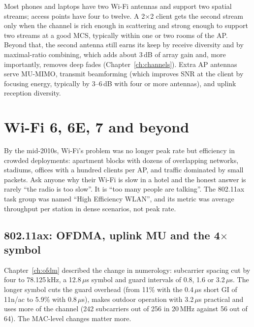\begin{inpractice}
Most phones and laptops have two Wi-Fi antennas and support two spatial streams; access points have
four to twelve. A 2$\times$2 client gets the second stream only when the channel is rich enough in
scattering and strong enough to support two streams at a good MCS, typically within one or two
rooms of the AP. Beyond that, the second antenna still earns its keep by receive diversity and by
maximal-ratio combining, which adds about 3\,dB of array gain and, more importantly, removes deep
fades (Chapter~\ref{ch:channels}). Extra AP antennas serve MU-MIMO, transmit beamforming (which
improves SNR at the client by focusing energy, typically by 3--6\,dB with four or more antennas), and
uplink reception diversity.
\end{inpractice}

\section{Wi-Fi 6, 6E, 7 and beyond}
\label{sec:ch22:he}

By the mid-2010s, Wi-Fi's problem was no longer peak rate but efficiency in crowded deployments:
apartment blocks with dozens of overlapping networks, stadiums, offices with a hundred clients per
AP, and traffic dominated by small packets. Ask anyone why their Wi-Fi is slow in a hotel and the
honest answer is rarely ``the radio is too slow''. It is ``too many people are talking''. The
802.11ax task group was named ``High Efficiency WLAN'', and its metric was average throughput per
station in dense scenarios, not peak rate.

\subsection{802.11ax: OFDMA, uplink MU and the 4$\times$ symbol}

Chapter~\ref{ch:ofdm} described the change in numerology: subcarrier spacing cut by four to
78.125\,kHz, a 12.8\,$\mu$s symbol and guard intervals of 0.8, 1.6 or 3.2\,$\mu$s. The longer symbol
cuts the guard overhead (from 11\% with the 0.4\,$\mu$s short GI of 11n/ac to 5.9\% with 0.8\,$\mu$s),
makes outdoor operation with 3.2\,$\mu$s practical and uses more of the channel (242 subcarriers out
of 256 in 20\,MHz against 56 out of 64). The MAC-level changes matter more.

